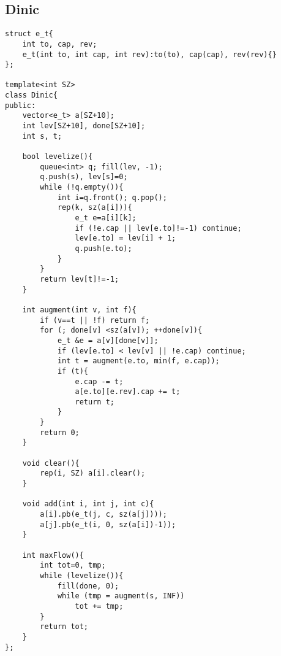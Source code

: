 \subsection{Dinic}
\begin{lstlisting}
struct e_t{ 
	int to, cap, rev;
	e_t(int to, int cap, int rev):to(to), cap(cap), rev(rev){}
};

template<int SZ>
class Dinic{
public:
	vector<e_t> a[SZ+10];
	int lev[SZ+10], done[SZ+10];	
	int s, t;

	bool levelize(){
		queue<int> q; fill(lev, -1);
		q.push(s), lev[s]=0;
		while (!q.empty()){
			int i=q.front(); q.pop();
			rep(k, sz(a[i])){
				e_t e=a[i][k];
				if (!e.cap || lev[e.to]!=-1) continue;
				lev[e.to] = lev[i] + 1;
				q.push(e.to);
			}
		}
		return lev[t]!=-1;
	}

	int augment(int v, int f){
		if (v==t || !f) return f;
		for (; done[v] <sz(a[v]); ++done[v]){
			e_t &e = a[v][done[v]];
			if (lev[e.to] < lev[v] || !e.cap) continue;
			int t = augment(e.to, min(f, e.cap));
			if (t){
				e.cap -= t;
				a[e.to][e.rev].cap += t;
				return t;
			}
		}
		return 0;
	}

	void clear(){
		rep(i, SZ) a[i].clear();
	}

	void add(int i, int j, int c){
		a[i].pb(e_t(j, c, sz(a[j])));
		a[j].pb(e_t(i, 0, sz(a[i])-1));
	}

	int maxFlow(){
		int tot=0, tmp;
		while (levelize()){
			fill(done, 0);
			while (tmp = augment(s, INF))
				tot += tmp;
		}
		return tot;
	}
};
\end{lstlisting}
